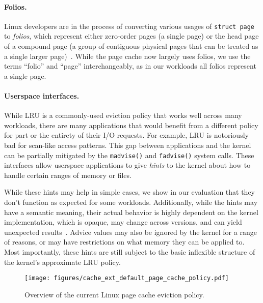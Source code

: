 \vspace{-1em}
\paragraph{Folios.} Linux developers are in the process of converting various usages of \texttt{struct page} to \emph{folios}, which represent either zero-order pages (a single page) or the head page of a compound page (a group of contiguous physical pages that can be treated as a single larger page)~\cite{folios-lwn}. While the page cache now largely uses folios, we use the terms ``folio'' and ``page'' interchangeably, as in our workloads all folios represent a single page.

\vspace{-1em}
\paragraph{Userspace interfaces.} While LRU is a commonly-used eviction policy that works well across many workloads, there are many applications that would benefit from a different policy for part or the entirety of their I/O requests. For example, LRU is notoriously bad for scan-like access patterns. This gap between applications and the kernel can be partially mitigated by the \texttt{madvise()} and \texttt{fadvise()} system calls. These interfaces allow userspace applications to give \emph{hints} to the kernel about how to handle certain ranges of memory or files.

While these hints may help in simple cases, we show in our evaluation that they don't function as expected for some workloads. Additionally, while the hints may have a semantic meaning, their actual behavior is highly dependent on the kernel implementation, which is opaque, may change across versions, and can yield unexpected results~\cite{madvise-man-pages,madvise-surge-2015}.
Advice values may also be ignored by the kernel for a range of reasons, or may have restrictions on what memory they can be applied to.
Most importantly, these hints are still subject to the basic inflexible structure of the kernel's approximate LRU policy. 

\begin{figure}[ht]
    \centering
    \texttt{[image: figures/cache\_ext\_default\_page\_cache\_policy.pdf]}
    \caption{Overview of the current Linux page cache eviction policy.}
    \label{fig:default-page-cache-policy}
\end{figure}

